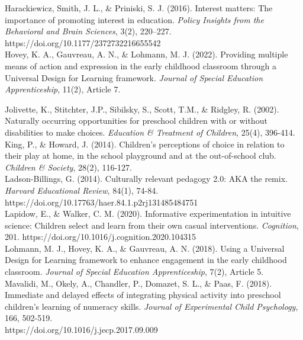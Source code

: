 \documentclass[11.5pt]{sig-alternate}
\begin{document}
Harackiewicz, Smith, J. L., \& Priniski, S. J. (2016). Interest matters: The importance of 
promoting interest in education. \textit{Policy Insights from the Behavioral and Brain Sciences}, 3(2), 220–227. \\https://doi.org/10.1177/2372732216655542 
\\

Hovey, K. A., Gauvreau, A. N., \& Lohmann, M. J. (2022). Providing multiple means of 
action and expression in the early childhood classroom through a Universal Design for Learning framework. \textit{Journal of Special Education Apprenticeship}, 11(2), Article 7.

Jolivette, K., Stitchter, J.P., Sibilsky, S., Scott, T.M., \& Ridgley, R. (2002). Naturally occurring
opportunities for preschool children with or without disabilities to make choices. \textit{Education \& Treatment of Children}, 25(4), 396-414.
\\

King, P., \& Howard, J. (2014). Children’s perceptions of choice in relation to their play at home, 
in the school playground and at the out-of-school club. \textit{Children \& Society}, 28(2), 116-127.
\\

Ladson-Billings, G. (2014). Culturally relevant pedagogy 2.0: AKA the remix. \textit{Harvard 
Educational Review}, 84(1), 74-84. \\https://doi.org/10.17763/haer.84.1.p2rj131485484751 
\\

Lapidow, E., \& Walker, C. M. (2020). Informative experimentation in intuitive science: 
Children select and learn from their own casual interventions. \textit{Cognition}, 201. https://doi.org/10.1016/j.cognition.2020.104315 
\\

Lohmann, M. J., Hovey, K. A., \& Gauvreau, A. N. (2018). Using a Universal Design for 
Learning framework to enhance engagement in the early childhood classroom. \textit{Journal of Special Education Apprenticeship}, 7(2), Article 5.
\\

Mavalidi, M., Okely, A., Chandler, P., Domazet, S. L., \& Paas, F. (2018). Immediate and 
delayed effects of integrating physical activity into preschool children’s learning of numeracy skills. \textit{Journal of Experimental Child Psychology}, 166, 502-519. \\https://doi.org/10.1016/j.jecp.2017.09.009 
\\
\end{document}
